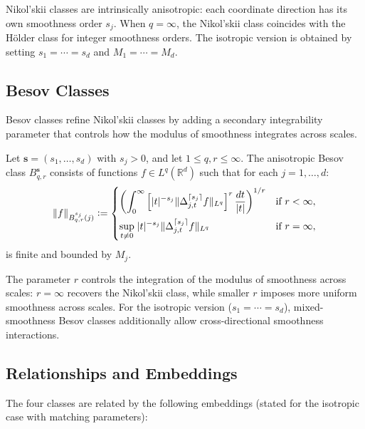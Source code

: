 Nikol'skii classes are intrinsically anisotropic: each coordinate direction has its own smoothness order $s_j$.
When $q = \infty$, the Nikol'skii class coincides with the Hölder class for integer smoothness orders.
The isotropic version is obtained by setting $s_1 = \cdots = s_d$ and $M_1 = \cdots = M_d$.


\subsection{Besov Classes}\label{sec:appendix:besov}

Besov classes refine Nikol'skii classes by adding a secondary integrability parameter that controls how the modulus of smoothness integrates across scales.

\begin{definition}\label{def:besov}
	Let $\mathbf{s} = (s_1, \ldots, s_d)$ with $s_j > 0$, and let $1 \leq q, r \leq \infty$.
	The anisotropic Besov class $B_{q,r}^{\mathbf{s}}$ consists of functions $f \in L^q(\mathbb{R}^d)$ such that for each $j = 1, \ldots, d$:
	\begin{equation*}
		\lVert f\rVert_{B_{q,r}^{s_j}(j)} \vcentcolon= \begin{cases}
			\displaystyle \left( \int_0^\infty \left[ \lvert t\rvert^{-s_j} \lVert\Delta_{j,t}^{\lceil s_j \rceil} f\rVert_{L^q} \right]^r \frac{dt}{\lvert t\rvert} \right)^{1/r} & \text{if } r < \infty, \\[10pt]
			\displaystyle \sup_{t \neq 0}\; \lvert t\rvert^{-s_j} \lVert\Delta_{j,t}^{\lceil s_j \rceil} f\rVert_{L^q} & \text{if } r = \infty,
		\end{cases}
	\end{equation*}
	is finite and bounded by $M_j$.
\end{definition}

The parameter $r$ controls the integration of the modulus of smoothness across scales: $r = \infty$ recovers the Nikol'skii class, while smaller $r$ imposes more uniform smoothness across scales.
For the isotropic version ($s_1 = \cdots = s_d$), mixed-smoothness Besov classes additionally allow cross-directional smoothness interactions.


\subsection{Relationships and Embeddings}\label{sec:appendix:embeddings}

The four classes are related by the following embeddings (stated for the isotropic case with matching parameters):

